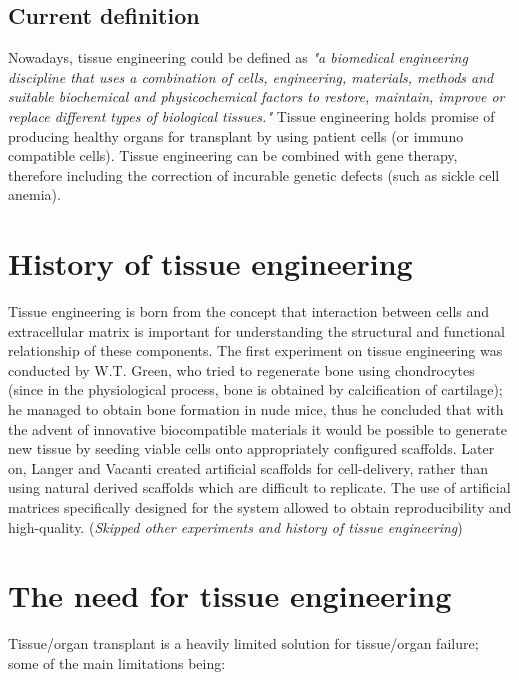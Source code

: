   \subsection{Current definition}
  Nowadays, tissue engineering could be defined as \textit{"a biomedical engineering discipline that uses a combination of cells, engineering, materials, methods and suitable biochemical and physicochemical factors to restore, maintain, improve or replace different types of biological tissues."}
  Tissue engineering holds promise of producing healthy organs for transplant by using patient cells (or immuno compatible cells). Tissue engineering can be combined with gene therapy, therefore including the correction of incurable genetic defects (such as sickle cell anemia).


\section{History of tissue engineering}
Tissue engineering is born from the concept that interaction between cells and extracellular matrix is important for understanding the structural and functional relationship of these components.
The first experiment on tissue engineering was conducted by W.T. Green, who tried to regenerate bone using chondrocytes (since in the physiological process, bone is obtained by calcification of cartilage); he managed to obtain bone formation in nude mice, thus he concluded that with the advent of innovative biocompatible materials it would be possible to generate new tissue by seeding viable cells onto appropriately configured scaffolds.
Later on, Langer and Vacanti created artificial scaffolds for cell-delivery, rather than using natural derived scaffolds which are difficult to replicate. The use of artificial matrices specifically designed for the system allowed to obtain reproducibility and high-quality.
(\textit{Skipped other experiments and history of tissue engineering})

\section{The need for tissue engineering}
Tissue/organ transplant is a heavily limited solution for tissue/organ failure; some of the main limitations being:

